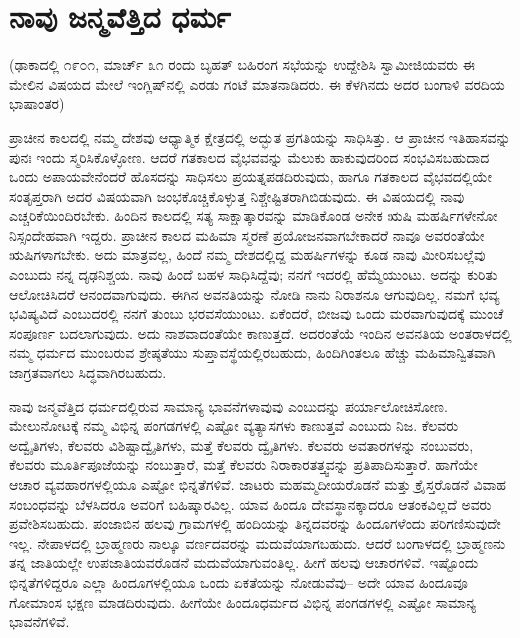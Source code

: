 
\chapter{ನಾವು ಜನ್ಮವೆತ್ತಿದ ಧರ್ಮ}

(ಢಾಕಾದಲ್ಲಿ ೧೯೦೧, ಮಾರ್ಚ್ ೩೧ ರಂದು ಬೃಹತ್​ ಬಹಿರಂಗ ಸಭೆಯನ್ನು ಉದ್ದೇಶಿಸಿ ಸ್ವಾಮೀಜಿಯವರು ಈ ಮೇಲಿನ ವಿಷಯದ ಮೇಲೆ ಇಂಗ್ಲಿಷ್​ನಲ್ಲಿ ಎರಡು ಗಂಟೆ ಮಾತನಾಡಿದರು. ಈ ಕೆಳಗಿನದು ಅದರ ಬಂಗಾಳಿ ವರದಿಯ ಭಾಷಾಂತರ)

ಪ್ರಾಚೀನ ಕಾಲದಲ್ಲಿ ನಮ್ಮ ದೇಶವು ಆಧ್ಯಾತ್ಮಿಕ ಕ್ಷೇತ್ರದಲ್ಲಿ ಅದ್ಭುತ ಪ್ರಗತಿಯನ್ನು ಸಾಧಿಸಿತ್ತು. ಆ ಪ್ರಾಚೀನ ಇತಿಹಾಸವನ್ನು ಪುನಃ ಇಂದು ಸ್ಮರಿಸಿಕೊಳ್ಳೋಣ. ಆದರೆ ಗತಕಾಲದ ವೈಭವವನ್ನು ಮೆಲುಕು ಹಾಕುವುದರಿಂದ ಸಂಭವಿಸಬಹುದಾದ ಒಂದು ಅಪಾಯವೇನೆಂದರೆ ಹೊಸದನ್ನು ಸಾಧಿಸಲು ಪ್ರಯತ್ನಪಡದಿರುವುದು, ಹಾಗೂ ಗತಕಾಲದ ವೈಭವದಲ್ಲಿಯೇ ಸಂತೃಪ್ತರಾಗಿ ಅದರ ವಿಷಯವಾಗಿ ಜಂಭಕೊಚ್ಚಿಕೊಳ್ಳುತ್ತ ನಿಶ್ಚೇಷ್ಟಿತರಾಗಿಬಿಡುವುದು. ಈ ವಿಷಯದಲ್ಲಿ ನಾವು ಎಚ್ಚರಿಕೆಯಿಂದಿರಬೇಕು. ಹಿಂದಿನ ಕಾಲದಲ್ಲಿ ಸತ್ಯ ಸಾಕ್ಷಾತ್ಕಾರವನ್ನು ಮಾಡಿಕೊಂಡ ಅನೇಕ ಋಷಿ ಮಹರ್ಷಿಗಳೇನೋ ನಿಸ್ಸಂದೇಹವಾಗಿ ಇದ್ದರು. ಪ್ರಾಚೀನ ಕಾಲದ ಮಹಿಮಾ ಸ್ಮರಣೆ ಪ್ರಯೋಜನವಾಗಬೇಕಾದರೆ ನಾವೂ ಅವರಂತೆಯೇ ಋಷಿಗಳಾಗಬೇಕು. ಅದು ಮಾತ್ರವಲ್ಲ, ಹಿಂದೆ ನಮ್ಮ ದೇಶದಲ್ಲಿದ್ದ ಮಹರ್ಷಿಗಳನ್ನು ಕೂಡ ನಾವು ಮೀರಿಸಬಲ್ಲೆವು ಎಂಬುದು ನನ್ನ ದೃಢನಿಶ್ಚಯ. ನಾವು ಹಿಂದೆ ಬಹಳ ಸಾಧಿಸಿದ್ದೆವು; ನನಗೆ ಇದರಲ್ಲಿ ಹೆಮ್ಮೆಯುಂಟು. ಅದನ್ನು ಕುರಿತು ಆಲೋಚಿಸಿದರೆ ಆನಂದವಾಗುವುದು. ಈಗಿನ ಅವನತಿಯನ್ನು ನೋಡಿ ನಾನು ನಿರಾಶನೂ ಆಗುವುದಿಲ್ಲ. ನಮಗೆ ಭವ್ಯ ಭವಿಷ್ಯವಿದೆ ಎಂಬುದರಲ್ಲಿ ನನಗೆ ತುಂಬು ಭರವಸೆಯುಂಟು. ಏಕೆಂದರೆ, ಬೀಜವು ಒಂದು ಮರವಾಗುವುದಕ್ಕೆ ಮುಂಚೆ ಸಂಪೂರ್ಣ ಬದಲಾಗುವುದು. ಅದು ನಾಶವಾದಂತೆಯೇ ಕಾಣುತ್ತದೆ. ಅದರಂತೆಯೆ ಇಂದಿನ ಅವನತಿಯ ಅಂತರಾಳದಲ್ಲಿ ನಮ್ಮ ಧರ್ಮದ ಮುಂಬರುವ ಶ್ರೇಷ್ಠತೆಯು ಸುಪ್ತಾವಸ್ಥೆಯಲ್ಲಿರಬಹುದು, ಹಿಂದಿಗಿಂತಲೂ ಹೆಚ್ಚು ಮಹಿಮಾನ್ವಿತವಾಗಿ ಜಾಗ್ರತವಾಗಲು ಸಿದ್ಧವಾಗಿರಬಹುದು.

ನಾವು ಜನ್ಮವೆತ್ತಿದ ಧರ್ಮದಲ್ಲಿರುವ ಸಾಮಾನ್ಯ ಭಾವನೆಗಳಾವುವು ಎಂಬುದನ್ನು ಪರ್ಯಾಲೋಚಿಸೋಣ. ಮೇಲುನೋಟಕ್ಕೆ ನಮ್ಮ ವಿಭಿನ್ನ ಪಂಗಡಗಳಲ್ಲಿ ಎಷ್ಟೋ ವ್ಯತ್ಯಾಸಗಳು ಕಾಣುತ್ತವೆ ಎಂಬುದು ನಿಜ. ಕೆಲವರು ಅದ್ವೈತಿಗಳು, ಕೆಲವರು ವಿಶಿಷ್ಟಾದ್ವೈತಿಗಳು, ಮತ್ತೆ ಕೆಲವರು ದ್ವೈತಿಗಳು. ಕೆಲವರು ಅವತಾರಗಳನ್ನು ನಂಬುವರು, ಕೆಲವರು ಮೂರ್ತಿಪೂಜೆಯನ್ನು ನಂಬುತ್ತಾರೆ, ಮತ್ತೆ ಕೆಲವರು ನಿರಾಕಾರತತ್ತ್ವವನ್ನು ಪ್ರತಿಪಾದಿಸುತ್ತಾರೆ. ಹಾಗೆಯೇ ಆಚಾರ ವ್ಯವಹಾರಗಳಲ್ಲಿಯೂ ಎಷ್ಟೋ ಭಿನ್ನತೆಗಳಿವೆ. ಜಾಟರು ಮಹಮ್ಮದೀಯರೊಡನೆ ಮತ್ತು ಕ್ರೈಸ್ತರೊಡನೆ ವಿವಾಹ ಸಂಬಂಧವನ್ನು ಬೆಳಸಿದರೂ ಅವರಿಗೆ ಬಹಿಷ್ಕಾರವಿಲ್ಲ. ಯಾವ ಹಿಂದೂ ದೇವಸ್ಥಾನಕ್ಕಾದರೂ ಆತಂಕವಿಲ್ಲದೆ ಅವರು ಪ್ರವೇಶಿಸಬಹುದು. ಪಂಜಾಬಿನ ಹಲವು ಗ್ರಾಮಗಳಲ್ಲಿ ಹಂದಿಯನ್ನು ತಿನ್ನದವರನ್ನು ಹಿಂದೂಗಳೆಂದು ಪರಿಗಣಿಸುವುದೇ ಇಲ್ಲ. ನೇಪಾಳದಲ್ಲಿ ಬ್ರಾಹ್ಮಣರು ನಾಲ್ಕೂ ವರ್ಣದವರನ್ನು ಮದುವೆಯಾಗಬಹುದು. ಆದರೆ ಬಂಗಾಳದಲ್ಲಿ ಬ್ರಾಹ್ಮಣನು ತನ್ನ ಜಾತಿಯಲ್ಲೇ ಉಪಜಾತಿಯವರೊಡನೆ ಮದುವೆಯಾಗುವಂತಿಲ್ಲ. ಹೀಗೆ ಹಲವು ಆಚಾರಗಳಿವೆ. ಇಷ್ಟೊಂದು ಭಿನ್ನತೆಗಳಿದ್ದರೂ ಎಲ್ಲಾ ಹಿಂದೂಗಳಲ್ಲಿಯೂ ಒಂದು ಏಕತೆಯನ್ನು ನೋಡುವೆವು– ಅದೇ ಯಾವ ಹಿಂದೂವೂ ಗೋಮಾಂಸ ಭಕ್ಷಣ ಮಾಡದಿರುವುದು. ಹೀಗೆಯೇ ಹಿಂದೂಧರ್ಮದ ವಿಭಿನ್ನ ಪಂಗಡಗಳಲ್ಲಿ ಎಷ್ಟೋ ಸಾಮಾನ್ಯ ಭಾವನೆಗಳಿವೆ.

